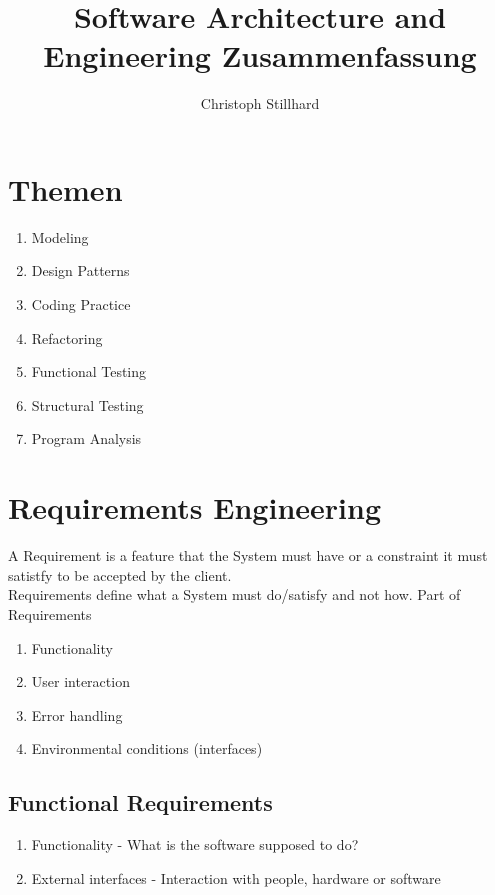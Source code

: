 \documentclass[10pt]{article}
\title{\textbf{Software Architecture and Engineering Zusammenfassung}}
\author{Christoph Stillhard}
\date{}
\begin{document}
\maketitle

\newcommand{\enumstart}{\begin{enumerate}}
\newcommand{\enumend}{\end{enumerate}}
\newcommand{\tablestart}{\begin{table}}
\newcommand{\tableend}{\end{table}}
\newcommand{\tabularstart}{\begin{tabular}}
\newcommand{\tabularend}{\end{tabular}}
\newcommand{\figurestart}{\begin{figure}[ht]}
\newcommand{\figureend}{\end{figure}}

\section{Themen}
\enumstart
	\item Modeling
	\item Design Patterns
	\item Coding Practice
	\item Refactoring
	\item Functional Testing
	\item Structural Testing
	\item Program Analysis
\enumend

\section{Requirements Engineering}
A Requirement is a feature that the System must have or a constraint it must satistfy to be accepted by the client.\\
Requirements define what a System must do/satisfy and not how.
Part of Requirements
\enumstart
	\item Functionality
	\item User interaction
	\item Error handling
	\item Environmental conditions (interfaces)
\enumend

\subsection{Functional Requirements}
\enumstart
	\item Functionality - What is the software supposed to do?
	\item External interfaces - Interaction with people, hardware or software
\enumend
\end{document}
